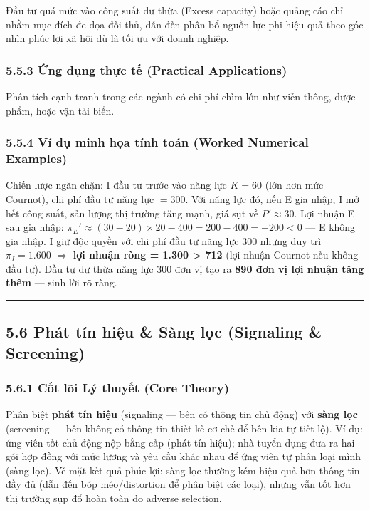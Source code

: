 \documentclass[
]{article}
\begin{document}
Đầu tư quá mức vào công suất dư thừa (Excess capacity) hoặc quảng cáo
chỉ nhằm mục đích đe dọa đối thủ, dẫn đến phân bổ nguồn lực phi hiệu quả
theo góc nhìn phúc lợi xã hội dù là tối ưu với doanh nghiệp.

\subsubsection{5.5.3 Ứng dụng thực tế (Practical
Applications)}\label{ux1ee9ng-dux1ee5ng-thux1ef1c-tux1ebf-practical-applications-6}

Phân tích cạnh tranh trong các ngành có chi phí chìm lớn như viễn thông,
dược phẩm, hoặc vận tải biển.

\subsubsection{5.5.4 Ví dụ minh họa tính toán (Worked Numerical
Examples)}\label{vuxed-dux1ee5-minh-hux1ecda-tuxednh-touxe1n-worked-numerical-examples-5}

Chiến lược ngăn chặn: I đầu tư trước vào năng lực \(K = 60\) (lớn hơn
mức Cournot), chi phí đầu tư năng lực \(= 300\). Với năng lực đó, nếu E
gia nhập, I mở hết công suất, sản lượng thị trường tăng mạnh, giá sụt về
\(P' \approx 30\). Lợi nhuận E sau gia nhập:
\(\pi_E' \approx (30-20) \times 20 - 400 = 200 - 400 = -200 < 0\) --- E
không gia nhập. I giữ độc quyền với chi phí đầu tư năng lực \(300\)
nhưng duy trì \(\pi_I = 1.600\) \(\Rightarrow\) \textbf{lợi nhuận ròng =
1.300 \textgreater{} 712} (lợi nhuận Cournot nếu không đầu tư). Đầu tư
dư thừa năng lực 300 đơn vị tạo ra \textbf{890 đơn vị lợi nhuận tăng
thêm} --- sinh lời rõ ràng.

\begin{center}\rule{0.5\linewidth}{0.5pt}\end{center}

\subsection{5.6 Phát tín hiệu \& Sàng lọc (Signaling \&
Screening)}\label{phuxe1t-tuxedn-hiux1ec7u-suxe0ng-lux1ecdc-signaling-screening}

\subsubsection{5.6.1 Cốt lõi Lý thuyết (Core
Theory)}\label{cux1ed1t-luxf5i-luxfd-thuyux1ebft-core-theory-6}

Phân biệt \textbf{phát tín hiệu} (signaling --- bên có thông tin chủ
động) với \textbf{sàng lọc} (screening --- bên không có thông tin thiết
kế cơ chế để bên kia tự tiết lộ). Ví dụ: ứng viên tốt chủ động nộp bằng
cấp (phát tín hiệu); nhà tuyển dụng đưa ra hai gói hợp đồng với mức
lương và yêu cầu khác nhau để ứng viên tự phân loại mình (sàng lọc). Về
mặt kết quả phúc lợi: sàng lọc thường kém hiệu quả hơn thông tin đầy đủ
(dẫn đến bóp méo/distortion để phân biệt các loại), nhưng vẫn tốt hơn
thị trường sụp đổ hoàn toàn do adverse selection.
\end{document}
